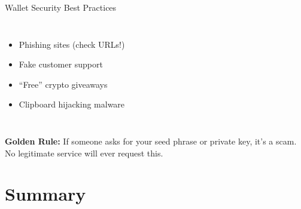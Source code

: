 \documentclass[8pt,aspectratio=169]{beamer}
\begin{document}
\begin{frame}[t]{Wallet Security Best Practices}
\begin{columns}[T]
\begin{itemize}
\item[\textcolor{mlred}{!}] Phishing sites (check URLs!)
\item[\textcolor{mlred}{!}] Fake customer support
\item[\textcolor{mlred}{!}] ``Free'' crypto giveaways
\item[\textcolor{mlred}{!}] Clipboard hijacking malware
\end{itemize}
\end{columns}

\vspace{0.3em}
\begin{center}
\colorbox{mllavender4}{\parbox{0.85\textwidth}{\centering
\textbf{Golden Rule:} If someone asks for your seed phrase or private key, it's a scam. No legitimate service will ever request this.
}}
\end{center}
\end{frame}

\section{Summary}
\end{document}

